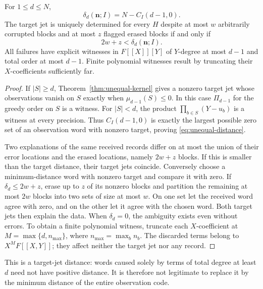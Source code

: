 \begin{theorem}
\label{thm:unequal-errors}
For $1\le d\le N$,
\begin{equation}
 \delta_d(\boldsymbol n;I)=N-C_I(d-1,0).
 \label{eq:unequal-distance}
\end{equation}
The target jet is uniquely determined for every $H$ despite at most $w$
arbitrarily corrupted blocks and at most $z$ flagged erased blocks if and
only if
\begin{equation}
 2w+z<\delta_d(\boldsymbol n;I).
 \label{eq:unequal-errors}
\end{equation}
All failures have explicit witnesses in $F[[X]][Y]$ of $Y$-degree at most
$d-1$ and total order at most $d-1$.  Finite polynomial witnesses result
by truncating their $X$-coefficients sufficiently far.
\end{theorem}

\begin{proof}
If $|S|\ge d$, Theorem~\ref{thm:unequal-kernel} gives a nonzero target jet
whose observations vanish on $S$ exactly when $\mu_{d-1}(S)\le0$.
In this case $\Pi_{d-1}$ for the greedy order on $S$ is a witness.
For $|S|<d$, the product $\prod_{b\in S}(Y-u_b)$ is a witness at every
precision.  Thus $C_I(d-1,0)$ is exactly the largest possible zero set of
an observation word with nonzero target, proving
\eqref{eq:unequal-distance}.

Two explanations of the same received records differ on at most the
union of their error locations and the erased locations, namely $2w+z$
blocks.  If this is smaller than the target distance, their target jets
coincide.  Conversely choose a minimum-distance word with nonzero target
and compare it with zero.  If $\delta_d\le2w+z$, erase up to $z$ of its
nonzero blocks and partition the remaining at most $2w$ blocks into two
sets of size at most $w$.  On one set let the received word agree with
zero, and on the other let it agree with the chosen word.  Both target
jets then explain the data.  When $\delta_d=0$, the ambiguity exists even
without errors.  To obtain a finite polynomial witness, truncate each
$X$-coefficient at $M=\max\{d,n_{\max}\}$, where
$n_{\max}=\max_b n_b$.  The discarded terms belong to $X^MF[[X,Y]]$;
they affect neither the target jet nor any record.
\end{proof}

This is a target-jet distance: words caused solely by terms of total degree
at least $d$ need not have positive distance.  It is therefore not legitimate
to replace it by the minimum distance of the entire observation code.

